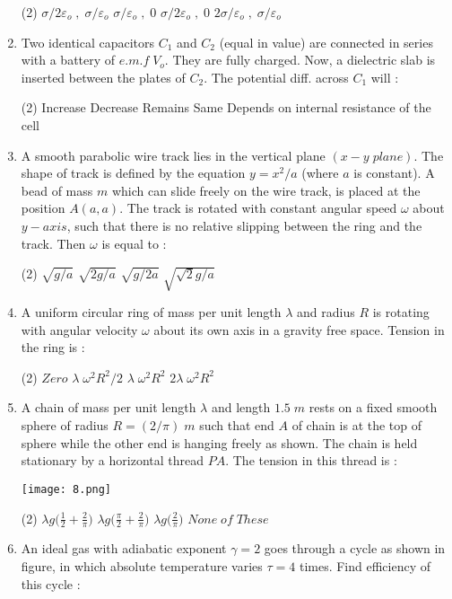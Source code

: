 \documentclass{article}
\begin{document}
\begin{enumerate}
\begin{tasks}(2)
\task \( \sigma/2\varepsilon_o \;,\; \sigma/\varepsilon_o \)
\task \( \sigma/\varepsilon_o \;,\; 0 \)
\task \( \sigma/2\varepsilon_o \;,\; 0 \)
\task \( 2\sigma/\varepsilon_o \;,\; \sigma/\varepsilon_o \)
\end{tasks}
\item Two identical capacitors \(C_1\) and \(C_2\) (equal in value) are connected in series with a battery of \(e.m.f \; V_o\). They are fully charged. Now, a dielectric slab is inserted between the plates of \(C_2\). The potential diff. across \(C_1\) will :
\begin{tasks}(2)
\task Increase
\task Decrease
\task Remains Same
\task Depends on internal resistance of the cell
\end{tasks}
\item A smooth parabolic wire track lies in the vertical plane \((x-y \; plane)\). The shape of track is defined by the equation \( y = x^2/a \) (where \(a\) is constant). A bead of mass \(m\) which can slide freely on the wire track, is placed at the position \(A(a, a)\). The track is rotated with constant angular speed \( \omega\) about \(y-axis\), such that there is no relative slipping between the ring and the track. Then \( \omega\) is equal to :
\begin{tasks}(2)
\task \large \( \sqrt{g / a}\)
\task \large \(\sqrt{2g / a}\)
\task \large \(\sqrt{g / 2a}\)
\task \large \(\sqrt{ \sqrt{2} g / a}\)
\end{tasks}
\item A uniform circular ring of mass per unit length \( \lambda\) and radius \(R\) is rotating with angular velocity \( \omega\) about its own axis in a gravity free space. Tension in the ring is :
\begin{tasks}(2)
\task \(Zero\)
\task \(\lambda \;\omega^2 R^2 /2\)
\task \(\lambda \;\omega^2 R^2\)
\task \(2\lambda \;\omega^2 R^2\)
\end{tasks}
\item A chain of mass per unit length \( \lambda\) and length \(1.5\; m\) rests on a fixed smooth sphere of radius \(R = (2/\pi)\; m\)  \; such that end \(A\) of chain is at the top of sphere while the other end is hanging freely as shown. The chain is held stationary by a horizontal thread \(PA\). The tension in this thread is :

\texttt{[image: 8.png]}

\begin{tasks}(2)
\task \large \(\lambda g \displaystyle \biggl( \frac{1}{2} + \frac{2}{\pi}\biggr)\)
\task \large \(\lambda g \displaystyle \biggl( \frac{\pi}{2} + \frac{2}{\pi}\biggr)\)
\task \large \(\lambda g \displaystyle \biggl( \frac{2}{\pi}\biggr)\)
\task \large \(None \; of\; These\)
\end{tasks}
\item An ideal gas with adiabatic exponent \( \gamma = 2\) goes through a cycle as shown in figure, in which absolute temperature varies \( \tau = 4\) times. Find efficiency of this cycle :


\end{enumerate}
\end{document}
